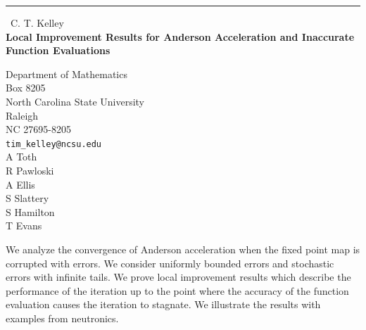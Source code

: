 \documentclass{report}
\begin{document}
\begin{center}
\rule{6in}{1pt} \
{\large C. T. Kelley \\
{\bf Local Improvement Results for Anderson Acceleration and Inaccurate Function Evaluations}}

Department of Mathematics \\ Box 8205 \\ North Carolina State University \\ Raleigh \\ NC 27695-8205
\\
{\tt tim\_kelley@ncsu.edu}\\
A Toth\\
R Pawloski\\
A Ellis\\
S Slattery\\
S Hamilton\\
T Evans\end{center}

We analyze the convergence of Anderson acceleration when the fixed point
map is corrupted with errors. We consider uniformly bounded errors and
stochastic errors with infinite tails. We prove local improvement
results which describe the performance of the iteration up to the point
where the accuracy of the function evaluation causes the iteration to
stagnate. We illustrate the results with examples from neutronics.
\end{document}
